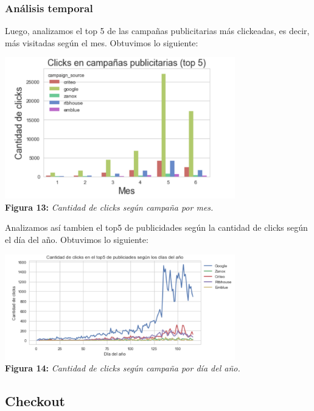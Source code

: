 \documentclass[titlepage,a4paper]{article}
\begin{document}
	\subsubsection{Análisis temporal}
	Luego, analizamos el top 5 de las campañas publicitarias más clickeadas, es decir, más visitadas según el mes. Obtuvimos lo siguiente: 
	\begin{center}
	\includegraphics[width=10cm] {top5campaniasPublicitariasMasImportantesSegunMes.jpg}\\
	\textbf{Figura 13:}  \textit{Cantidad de clicks según campaña por mes.}
	\end{center}
	Analizamos así tambien el top5 de publicidades según la cantidad de clicks según el día del año. Obtuvimos lo siguiente:
	\begin{center}
	\includegraphics[width=10cm] {cantidadDeClicksSegunDiaDelAnio.jpg}\\
	\textbf{Figura 14:}  \textit{Cantidad de clicks según campaña por día del año.  }
	\end{center}
	\subsection{Checkout}
\end{document}
